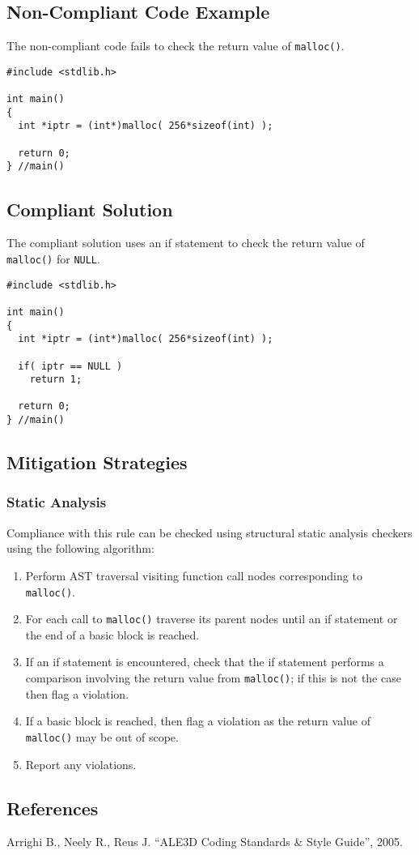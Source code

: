 \subsection{Non-Compliant Code Example}
The non-compliant code fails to check the return value of {\tt malloc()}.

\begin{verbatim}
#include <stdlib.h>

int main()
{
  int *iptr = (int*)malloc( 256*sizeof(int) );

  return 0;
} //main()
\end{verbatim}

\subsection{Compliant Solution}
The compliant solution uses an if statement to check the return value of {\tt malloc()} for {\tt NULL}.

\begin{verbatim}
#include <stdlib.h>

int main()
{
  int *iptr = (int*)malloc( 256*sizeof(int) );

  if( iptr == NULL )
    return 1;

  return 0;
} //main()
\end{verbatim}

\subsection{Mitigation Strategies}
\subsubsection{Static Analysis} 

Compliance with this rule can be checked using structural static analysis checkers using the following algorithm:

\begin{enumerate}
\item Perform AST traversal visiting function call nodes corresponding to {\tt malloc()}.
\item For each call to {\tt malloc()} traverse its parent nodes until an if statement or the end of a basic block is reached.
\item If an if statement is encountered, check that the if statement performs a comparison involving the return value from {\tt malloc()}; if this is not the case then flag a violation.
\item If a basic block is reached, then flag a violation as the return value of {\tt malloc()} may be out of scope.
\item Report any violations. 
\end{enumerate}

\subsection{References}

Arrighi B., Neely R., Reus J. ``ALE3D Coding Standards \& Style Guide'', 2005.
